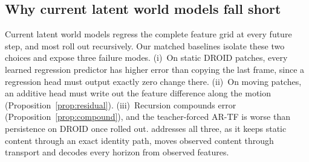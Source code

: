 \subsection{Why current latent world models fall short}\label{app:why-short}
Current latent world models regress the complete feature grid at every future step, and most roll out recursively.
%
Our matched baselines isolate these two choices and expose three failure modes.
%
(i)~On static DROID patches, every learned regression predictor has higher error than copying the last frame, since a
regression head must output exactly zero change there.
%
(ii)~On moving patches, an additive head must write out the feature difference along the motion
(Proposition~\ref{prop:residual}).
%
(iii)~Recursion compounds error (Proposition~\ref{prop:compound}), and the teacher-forced AR-TF is worse than persistence
on DROID once rolled out.
%
\ours{} addresses all three, as it keeps static content through an exact identity path, moves observed content through
transport and decodes every horizon from observed features.

